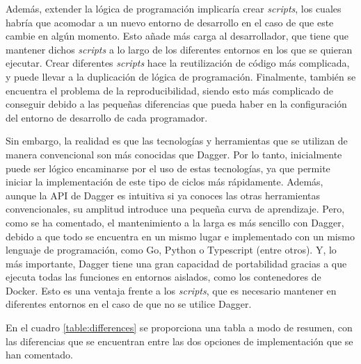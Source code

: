 Además, extender la lógica de programación implicaría crear \textit{scripts}, los cuales habría que acomodar a un nuevo entorno de desarrollo en el caso de que este cambie en algún momento. Esto añade más carga al desarrollador, que tiene que mantener dichos \textit{scripts} a lo largo de los diferentes entornos en los que se quieran ejecutar. Crear diferentes \textit{scripts} hace la reutilización de código más complicada, y puede llevar a la duplicación de lógica de programación. Finalmente, también se encuentra el problema de la reproducibilidad, siendo esto más complicado de conseguir debido a las pequeñas diferencias que pueda haber en la configuración del entorno de desarrollo de cada programador.

Sin embargo, la realidad es que las tecnologías y herramientas que se utilizan de manera convencional son más conocidas que Dagger. Por lo tanto, inicialmente puede ser lógico encaminarse por el uso de estas tecnologías, ya que permite iniciar la implementación de este tipo de ciclos más rápidamente. Además, aunque la API de Dagger es intuitiva si ya conoces las otras herramientas convencionales, su amplitud introduce una pequeña curva de aprendizaje. Pero, como se ha comentado, el mantenimiento a la larga es más sencillo con Dagger, debido a que todo se encuentra en un mismo lugar e implementado con un mismo lenguaje de programación, como Go, Python o Typescript (entre otros). Y, lo más importante, Dagger tiene una gran capacidad de portabilidad gracias a que ejecuta todas las funciones en entornos aislados, como los contenedores de Docker. Esto es una ventaja frente a los \textit{scripts}, que es necesario mantener en diferentes entornos en el caso de que no se utilice Dagger.

En el cuadro \ref{table:differences} se proporciona una tabla a modo de resumen, con las diferencias que se encuentran entre las dos opciones de implementación que se han comentado.

